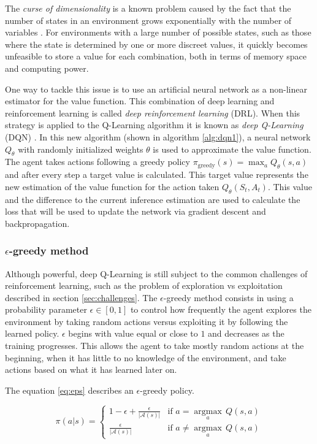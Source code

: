 The \textit{curse of dimensionality} is a known problem caused by the fact that the number of states in an environment grows exponentially with the number of variables \cite{Bellman:1957}. For environments with a large number of possible states, such as those where the state is determined by one or more discreet values, it quickly becomes unfeasible to store a value for each combination, both in terms of memory space and computing power.

One way to tackle this issue is to use an artificial neural network as a non-linear estimator for the value function. This combination of deep learning and reinforcement learning is called \textit{deep reinforcement learning} (DRL). When this strategy is applied to the Q-Learning algorithm it is known as \textit{deep Q-Learning} (DQN) \cite{Mnih:2013}. In this new algorithm (shown in algorithm \ref{alg:dqn1}), a neural network $Q_\theta$ with randomly initialized weights $\theta$ is used to approximate the value function. The agent takes actions following a greedy policy $\pi_\textrm{greedy}(s) = \max_a Q_\theta(s,a)$ and after every step a target value is calculated. This target value represents the new estimation of the value function for the action taken $Q_\theta(S_t, A_t)$. This value and the difference to the current inference estimation are used to calculate the loss that will be used to update the network via gradient descent and backpropagation.

\subsubsection*{$\epsilon$-greedy method}

Although powerful, deep Q-Learning is still subject to the common challenges of reinforcement learning, such as the problem of exploration vs exploitation described in section \ref{sec:challenges}. The $\epsilon$-greedy method consists in using a probability parameter $\epsilon \in [0,1]$ to control how frequently the agent explores the environment by taking random actions versus exploiting it by following the learned policy. $\epsilon$ begins with value equal or close to $1$ and decreases as the training progresses. This allows the agent to take mostly random actions at the beginning, when it has little to no knowledge of the environment, and take actions based on what it has learned later on.

The equation \ref{eq:eps} describes an $\epsilon$-greedy policy.

\begin{equation}
\label{eq:eps}
    \pi(a|s) =
    \begin{cases}
        1-\epsilon + \frac{\epsilon}{|\mathcal{A}(s)|} & \textrm{if $a = \underset{a}{\operatorname{argmax}}\,Q(s, a)$}\\
        \frac{\epsilon}{|\mathcal{A}(s)|} & \textrm{if $a \neq \underset{a}{\operatorname{argmax}}\,Q(s, a)$}
    \end{cases}
\end{equation}

